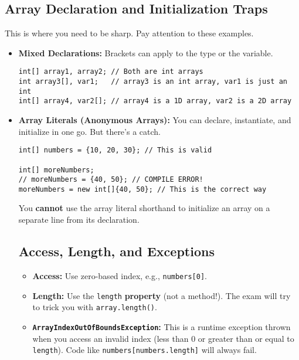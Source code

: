 \documentclass[12pt]{article}
\begin{document}
\begin{enumerate}[label=(\arabic*)]
\subsection*{Array Declaration and Initialization Traps}
This is where you need to be sharp. Pay attention to these examples.
\begin{itemize}
    \item \textbf{Mixed Declarations:} Brackets can apply to the type or the variable.
\begin{verbatim}
int[] array1, array2; // Both are int arrays
int array3[], var1;   // array3 is an int array, var1 is just an int
int[] array4, var2[]; // array4 is a 1D array, var2 is a 2D array
\end{verbatim}
    \item \textbf{Array Literals (Anonymous Arrays):} You can declare, instantiate, and initialize in one go. But there's a catch.
\begin{verbatim}
int[] numbers = {10, 20, 30}; // This is valid

int[] moreNumbers;
// moreNumbers = {40, 50}; // COMPILE ERROR!
moreNumbers = new int[]{40, 50}; // This is the correct way
\end{verbatim}
You \textbf{cannot} use the array literal shorthand to initialize an array on a separate line from its declaration.

\subsection{Access, Length, and Exceptions}
\begin{itemize}
    \item \textbf{Access:} Use zero-based index, e.g., \texttt{numbers[0]}.
    \item \textbf{Length:} Use the \texttt{length} \textbf{property} (not a method!). The exam will try to trick you with \texttt{array.length()}.
    \item \textbf{\texttt{ArrayIndexOutOfBoundsException}:} This is a runtime exception thrown when you access an invalid index (less than 0 or greater than or equal to \texttt{length}). Code like \texttt{numbers[numbers.length]} will always fail.
\end{itemize}


\end{itemize}
\end{enumerate}
\end{document}
